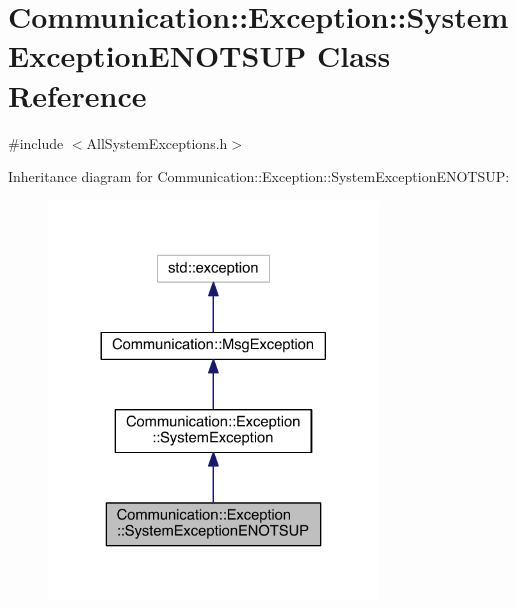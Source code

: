 \hypertarget{class_communication_1_1_exception_1_1_system_exception_e_n_o_t_s_u_p}{}\section{Communication\+:\+:Exception\+:\+:System\+Exception\+E\+N\+O\+T\+S\+U\+P Class Reference}
\label{class_communication_1_1_exception_1_1_system_exception_e_n_o_t_s_u_p}


{\ttfamily \#include $<$All\+System\+Exceptions.\+h$>$}



Inheritance diagram for Communication\+:\+:Exception\+:\+:System\+Exception\+E\+N\+O\+T\+S\+U\+P\+:\nopagebreak
\begin{figure}[H]
\begin{center}
\leavevmode
\includegraphics[width=248pt]{class_communication_1_1_exception_1_1_system_exception_e_n_o_t_s_u_p__inherit__graph}
\end{center}
\end{figure}


